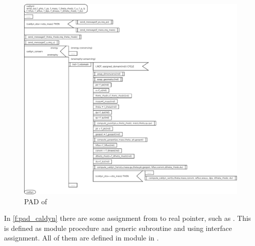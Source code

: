 \begin{figure}[htb]
\centering
\includegraphics[scale=.4]{figs/caldyn.pdf}
\caption{PAD of }\label{f:pad_caldyn}%
\end{figure}

In \autoref{f:pad_caldyn} there are some assignment from
 to real pointer, such as .
%
This is defined as module procedure and generic subroutine
 and using interface assignment.
%
All of them are defined in module  in .


